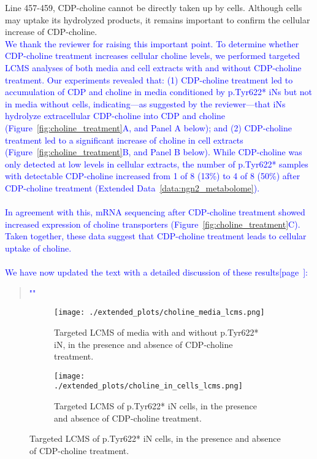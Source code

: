 Line 457-459, CDP-choline cannot be directly taken up by cells. Although cells may uptake its hydrolyzed products, it remains important to confirm the cellular increase of CDP-choline.\\
\textcolor{blue}{We thank the reviewer for raising this important point. To determine whether CDP-choline treatment increases cellular choline levels, we performed targeted LCMS analyses of both media and cell extracts with and without CDP-choline treatment. Our experiments revealed that: (1) CDP-choline treatment led to accumulation of CDP and choline in media conditioned by p.Tyr622* iNs but not in media without cells, indicating—as suggested by the reviewer—that iNs hydrolyze extracellular CDP-choline into CDP and choline (Figure~\ref{fig:choline_treatment}A, and Panel A below); and (2) CDP-choline treatment led to a  significant increase of choline in cell extracts (Figure~\ref{fig:choline_treatment}B, and Panel B below). While CDP-choline was only detected at low levels in cellular extracts, the number of  p.Tyr622* samples with detectable CDP-choline increased from 1 of 8 (13\%) to 4 of 8 (50\%) after CDP-choline treatment (Extended Data~\ref{data:ngn2_metabolome}).}\\\\
\textcolor{blue}{In agreement with this, mRNA sequencing after CDP-choline treatment showed increased expression of choline transporters (Figure~\ref{fig:choline_treatment}C). Taken together, these data suggest that CDP-choline treatment leads to cellular uptake of choline.}\\\\
\textcolor{blue}{We have now updated the text with a detailed discussion of these results[page~\pageref{quoteD-label}]:}
\begin{quote}
	\textcolor{blue}{"\quoteD"}
\end{quote}

\begin{figure}[H] 
	\begin{subfigure}[t]{\textwidth}
		\caption{Targeted LCMS of media with and without p.Tyr622* iN, in the presence and absence of CDP-choline treatment.}
		\texttt{[image: ./extended\_plots/choline\_media\_lcms.png]}        
	\end{subfigure}
	\centering
	\begin{subfigure}[t]{.4\textwidth}
		\caption{Targeted LCMS of p.Tyr622* iN cells, in the presence and absence of CDP-choline treatment.}
		\texttt{[image: ./extended\_plots/choline\_in\_cells\_lcms.png]}        
	\end{subfigure}
\end{figure}


